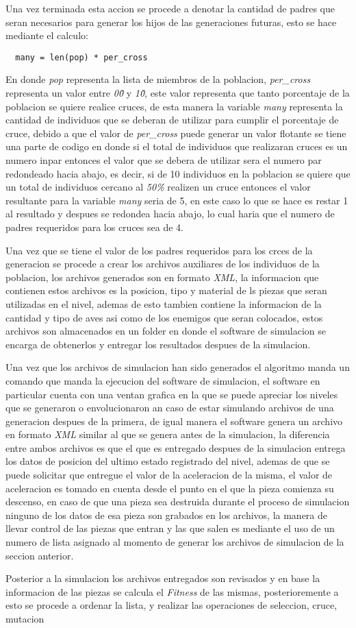 Una vez terminada esta accion se procede a denotar la cantidad de padres que
seran necesarios para generar los hijos de las generaciones futuras, esto se
hace mediante el calculo:
\begin{verbatim}
  many = len(pop) * per_cross
\end{verbatim}
En donde \textit{pop} representa la lista de miembros de la poblacion,
\textit{per\_cross} representa un valor entre \textit{0\.0} y \textit{1\.0}, este
valor representa que tanto porcentaje de la poblacion se quiere realice cruces,
de esta manera la variable \textit{many} representa la cantidad de individuos
que se deberan de utilizar para cumplir el porcentaje de cruce, debido a que el
valor de \textit{per\_cross} puede generar un valor flotante se tiene una parte
de codigo en donde si el total de individuos que realizaran cruces es un numero
inpar entonces el valor que se debera de utilizar sera el numero par redondeado
hacia abajo, es decir, si de 10 individuos en la poblacion se quiere que un
total de individuos cercano al \textit{50\%} realizen un cruce entonces el valor
resultante para la variable \textit{many} seria de 5, en este caso lo que se
hace es restar 1 al resultado y despues se redondea hacia abajo, lo cual haria
que el numero de padres requeridos para los cruces sea de 4.

Una vez que se tiene el valor de los padres requeridos para los crces de la
generacion se procede a crear los archivos auxiliares de los individuos de la
poblacion, los archivos generados son en formato \textit{XML}, la informacion
que contienen estos archivos es la posicion, tipo y material de ls piezas que
seran utilizadas en el nivel, ademas de esto tambien contiene la informacion de
la cantidad y tipo de aves asi como de los enemigos que seran colocados, estos
archivos son almacenados en un folder en donde el software de simulacion se
encarga de obtenerlos y entregar los resultados despues de la simulacion.

Una vez que los archivos de simulacion han sido generados el algoritmo manda un
comando que manda la ejecucion del software de simulacion, el software en
particular cuenta con una ventan grafica en la que se puede apreciar los niveles
que se generaron o envolucionaron an caso de estar simulando archivos de una
generacion despues de la primera, de igual manera el software genera un archivo
en formato \textit{XML} similar al que se genera antes de la simulacion, la
diferencia entre ambos archivos es que el que es entregado despues de la
simulacion entrega los datos de posicion del ultimo estado registrado del nivel,
ademas de que se puede solicitar que entregue el valor de la aceleracion de la
misma, el valor de aceleracion es tomado en cuenta desde el punto en el que la
pieza comienza su descenso, en caso de que una pieza sea destruida durante el
proceso de simulacion ninguno de los datos de esa pieza son grabados en los
archivos, la manera de llevar control de las piezas que entran y las que salen
es mediante el uso de un numero de lista asignado al momento de generar los
archivos de simulacion de la seccion anterior.

Posterior a la simulacion los archivos entregados son revisados y en base la
informacion de las piezas se calcula el \textit{Fitness} de las mismas,
posterioremente a esto se procede a ordenar la lista, y realizar las operaciones
de seleccion, cruce, mutacion